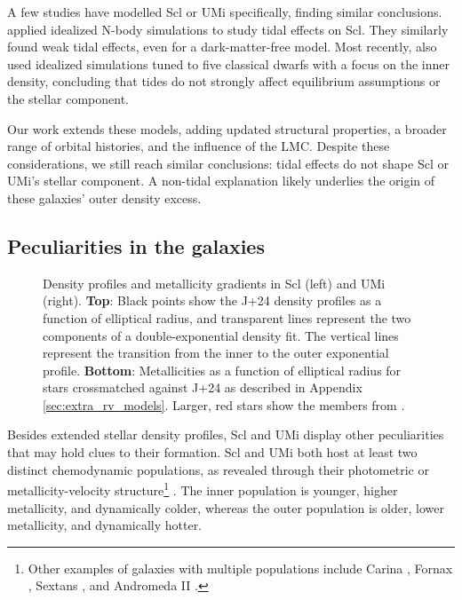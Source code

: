 A few studies have modelled Scl or UMi specifically, finding similar
conclusions. \citet{iorio+2019} applied idealized N-body simulations to
study tidal effects on Scl. They similarly found weak tidal effects,
even for a dark-matter-free model. Most recently,
\citet{tchiorniy+genina2025} also used idealized simulations tuned to
five classical dwarfs with a focus on the inner density, concluding that
tides do not strongly affect equilibrium assumptions or the stellar
component.

Our work extends these models, adding updated structural properties, a
broader range of orbital histories, and the influence of the LMC.
Despite these considerations, we still reach similar conclusions: tidal
effects do not shape Scl or UMi's stellar component. A non-tidal
explanation likely underlies the origin of these galaxies' outer density
excess.

\subsection{Peculiarities in the galaxies}\label{sec:peculiarities}

\begin{figure}
\centering
{}
\caption[Metallicity gradients in Sculptor and Ursa Minor]{Density
profiles and metallicity gradients in Scl (left) and UMi (right).
\textbf{Top}: Black points show the J+24 density profiles as a function
of elliptical radius, and transparent lines represent the two components
of a double-exponential density fit. The vertical lines represent the
transition from the inner to the outer exponential profile.
\textbf{Bottom}: Metallicities as a function of elliptical radius for
stars crossmatched against J+24 as described in Appendix
\ref{sec:extra_rv_models}. Larger, red stars show the members from
\citet{sestito+2023a, sestito+2023b}.}\label{fig:metallicity_gradients}
\end{figure}

Besides extended stellar density profiles, Scl and UMi display other
peculiarities that may hold clues to their formation. Scl and UMi both
host at least two distinct chemodynamic populations, as revealed through
their photometric or metallicity-velocity structure\footnote{Other
  examples of galaxies with multiple populations include Carina
  \citep{battaglia+2012, fabrizio+2016, kordopatis+2016}, Fornax
  \citep{battaglia+2006, amorisco+evans2012, delpino+aparicio+hidalgo2015},
  Sextans
  \citep{battaglia+2011, cicuendez+battaglia2018, roederer+2023}, and
  Andromeda II
  \citep{mcconnachie+arimoto+irwin2007, ho+2012, delpino+2017}.}
\citep{tolstoy+2004, battaglia+2008, pace+2020}. The inner population is
younger, higher metallicity, and dynamically colder, whereas the outer
population is older, lower metallicity, and dynamically hotter.

